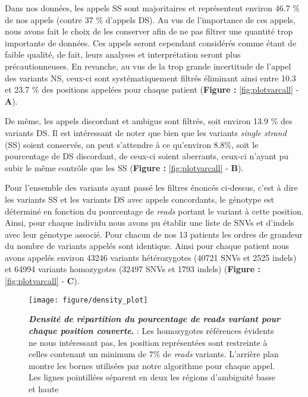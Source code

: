\documentclass[12pt,twoside]{ugathesis}
\begin{document}
Dans nos données, les appels SS sont majoritaires et représentent
environ 46.7 \% de nos appels (contre 37 \% d'appels DS). Au vus de
l'importance de ces appels, nous avons fait le choix de les conserver
afin de ne pas filtrer une quantité trop importante de données. Ces
appels seront cependant considérés comme étant de faible qualité, de
fait, leurs analyses et interprétation seront plus précautionneuses. En
revanche, au vus de la trop grande incertitude de l'appel des variants
NS, ceux-ci sont systématiquement filtrés éliminant ainsi entre 10.3 et
23.7 \% des positions appelées pour chaque patient (\textbf{Figure :
}\ref{fig:plotvarcall} - \textbf{A}).

De même, les appels discordant et ambigus sont filtrés, soit environ
13.9 \% des variants DS. Il est intéressant de noter que bien que les
variants \emph{single strand} (SS) soient conservés, on peut s'attendre
à ce qu'environ 8.8\%, soit le pourcentage de DS discordant, de ceux-ci
soient aberrants, ceux-ci n'ayant pu subir le même contrôle que les SS
(\textbf{Figure : }\ref{fig:plotvarcall} - \textbf{B}).

Pour l'ensemble des variants ayant passé les filtres énoncés ci-dessus,
c'est à dire les variants SS et les variants DS avec appels concordants,
le génotype est déterminé en fonction du pourcentage de \emph{reads}
portant le variant à cette position. Ainsi, pour chaque individu nous
avons pu établir une liste de SNVs et d'indels avec leur génotype
associé. Pour chacun de nos 13 patients les ordres de grandeur du nombre
de variants appelés sont identique. Ainsi pour chaque patient nous avons
appelés environ 43246 variants hétérozygotes (40721 SNVs et 2525 indels)
et 64994 variants homozygotes (32497 SNVs et 1793 indels)
(\textbf{Figure : }\ref{fig:plotvarcall} - \textbf{C}).

\newpage

\begin{figure}

{\centering \texttt{[image: figure/density\_plot]} 

}

\caption[Densité de répartition du pourcentage de reads variant pour chaque position couverte]{\textbf{\emph{Densité de répartition du pourcentage
de reads variant pour chaque position couverte}.} : Les homozygotes
références évidents ne nous intéressant pas, les position représentées
sont restreinte à celles contenant un minimum de 7\% de \emph{reads}
variants. L'arrière plan montre les bornes utilisées par notre
algorithme pour chaque appel. Les lignes pointillées séparent en deux
les régions d'ambiguité basse et haute}\label{fig:plotdensityvar}
\end{figure}
\end{document}
